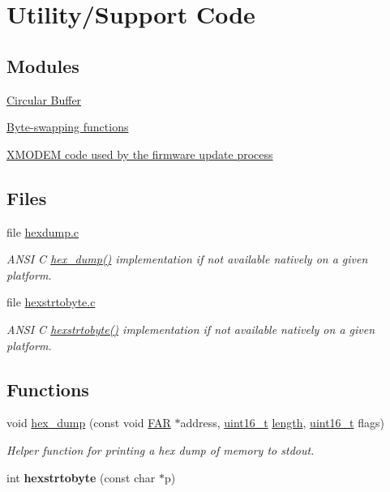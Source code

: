 \hypertarget{group__util}{}\section{Utility/\+Support Code}
\label{group__util}
\subsection*{Modules}
\begin{DoxyCompactItemize}
\item 
\hyperlink{group__util__cbuf}{Circular Buffer}
\item 
\hyperlink{group__util__byteorder}{Byte-\/swapping functions}
\item 
\hyperlink{group__util__xmodem}{X\+M\+O\+D\+E\+M code used by the firmware update process}
\end{DoxyCompactItemize}
\subsection*{Files}
\begin{DoxyCompactItemize}
\item 
file \hyperlink{hexdump_8c}{hexdump.\+c}
\begin{DoxyCompactList}\small\item\em A\+N\+SI C \hyperlink{group__util_gaa321236a0cb6f4e0dad592fdf1b550d2}{hex\+\_\+dump()} implementation if not available natively on a given platform. \end{DoxyCompactList}\item 
file \hyperlink{hexstrtobyte_8c}{hexstrtobyte.\+c}
\begin{DoxyCompactList}\small\item\em A\+N\+SI C \hyperlink{group__hal_ga519e5ae2049b59689a474a8c48fee353}{hexstrtobyte()} implementation if not available natively on a given platform. \end{DoxyCompactList}\end{DoxyCompactItemize}
\subsection*{Functions}
\begin{DoxyCompactItemize}
\item 
void \hyperlink{group__util_gaa321236a0cb6f4e0dad592fdf1b550d2}{hex\+\_\+dump} (const void \hyperlink{group__hal_gaef060b3456fdcc093a7210a762d5f2ed}{F\+AR} $\ast$address, \hyperlink{group__hal__dos_ga5a8b2dc9e45a9ee81a94ef304fb62505}{uint16\+\_\+t} \hyperlink{group__zdo_gab2b3adeb2a67e656ff030b56727fd0ac}{length}, \hyperlink{group__hal__dos_ga5a8b2dc9e45a9ee81a94ef304fb62505}{uint16\+\_\+t} flags)
\begin{DoxyCompactList}\small\item\em Helper function for printing a hex dump of memory to stdout. \end{DoxyCompactList}\item 
\mbox{\label{group__util_ga7ef9d8eaba1a5730261c557b1cb0a36b}} 
int {\bfseries hexstrtobyte} (const char $\ast$p)
\end{DoxyCompactItemize}


